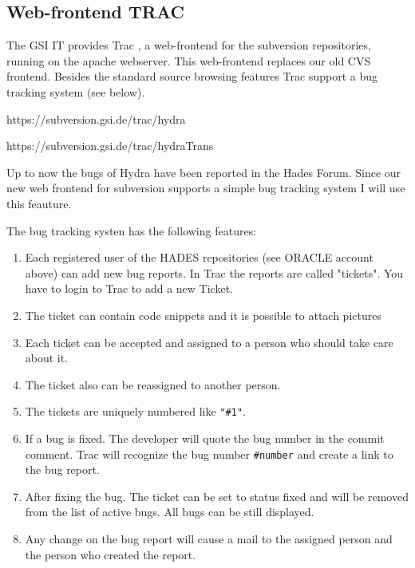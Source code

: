 \subsection{Web-frontend TRAC} \label{Chapter_trac}

The GSI IT provides Trac , a web-frontend for the subversion repositories, 
running on the apache webserver. This web-frontend replaces our old CVS frontend. 
Besides the standard source browsing features Trac support a bug tracking 
system (see below).

https://subversion.gsi.de/trac/hydra

https://subversion.gsi.de/trac/hydraTrans

Up to now the bugs of Hydra have been reported in the Hades Forum. Since our new web frontend for subversion supports a simple bug tracking system I will use this feauture.

The bug tracking systen has the following features:

\begin{enumerate}
    \item Each registered user of the HADES repositories (see ORACLE account above) can add new bug reports. In Trac the reports are called "tickets". You have to login to Trac to add a new Ticket.
    \item The ticket can contain code snippets and it is possible to attach pictures
    \item Each ticket can be accepted and assigned to a person who should take care about it.
    \item The ticket also can be reassigned to another person.
    \item The tickets are uniquely numbered like \verb+"#1"+.
    \item If a bug is fixed. The developer will quote the bug number in the commit comment. Trac will recognize the bug number \verb+#number+ and create a link to the bug report.
    \item After fixing the bug. The ticket can be set to status fixed and will be removed from the list of active bugs. All bugs can be still displayed.
    \item Any change on the bug report will cause a mail to the assigned person and the person who created the report.
\end{enumerate}





